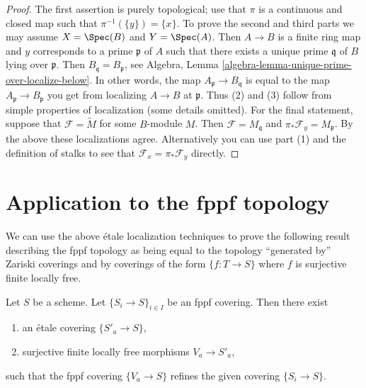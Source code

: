 \begin{proof}
The first assertion is purely topological; use that
$\pi$ is a continuous and closed map such that $\pi^{-1}(\{y\}) = \{x\}$.
To prove the second and third parts we may assume
$X = \Spec(B)$ and $Y = \Spec(A)$. Then
$A \to B$ is a finite ring map and $y$ corresponds to a prime
$\mathfrak p$ of $A$ such that there exists a unique prime $\mathfrak q$ of
$B$ lying over $\mathfrak p$. Then
$B_{\mathfrak q} = B_{\mathfrak p}$, see
Algebra, Lemma \ref{algebra-lemma-unique-prime-over-localize-below}.
In other words, the map $A_{\mathfrak p} \to B_{\mathfrak q}$
is equal to the map $A_{\mathfrak p} \to B_{\mathfrak p}$ you get
from localizing $A \to B$ at $\mathfrak p$.
Thus (2) and (3) follow from simple properties of localization
(some details omitted). For the final statement, suppose that
$\mathcal{F} = \widetilde M$ for some $B$-module $M$.
Then $\mathcal{F} = M_{\mathfrak q}$ and
$\pi_*\mathcal{F}_y = M_{\mathfrak p}$. By the above these
localizations agree. Alternatively you can use part (1) and
the definition of stalks to see that $\mathcal{F}_x = \pi_*\mathcal{F}_y$
directly.
\end{proof}






\section{Application to the fppf topology}
\label{section-application-fppf}

\noindent
We can use the above \'etale localization techniques to prove the
following result describing the fppf topology as being equal to
the topology ``generated by'' Zariski coverings and by coverings of the
form $\{f : T \to S\}$ where $f$ is surjective finite locally free.

\begin{lemma}
\label{lemma-dominate-fppf-etale-locally}
Let $S$ be a scheme. Let $\{S_i \to S\}_{i \in I}$ be an fppf covering.
Then there exist
\begin{enumerate}
\item an \'etale covering $\{S'_a \to S\}$,
\item surjective finite locally free morphisms $V_a \to S'_a$,
\end{enumerate}
such that the fppf covering $\{V_a \to S\}$ refines the given
covering $\{S_i \to S\}$.
\end{lemma}

